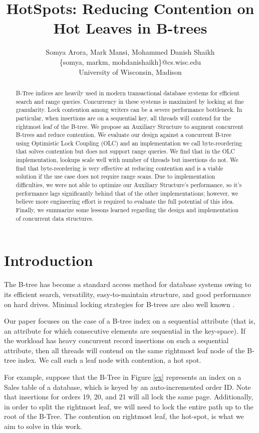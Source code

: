 \documentclass[twocolumn]{article}
\title{HotSpots: Reducing Contention on Hot Leaves in B-trees}
\date{}
\author{Somya Arora, Mark Mansi, Mohammed Danish Shaikh\\
\small{\{somya, markm, mohdanishaikh\}@cs.wisc.edu} \\
University of Wisconsin, Madison}
\begin{document}
\maketitle

\begin{abstract}
B-Tree indices are heavily used in modern transactional database systems for
efficient search and range queries. Concurrency in these systems is maximized
by locking at fine granularity. Lock contention among writers can be a severe
performance bottleneck. In particular, when insertions are on a sequential key,
all threads will contend for the rightmost leaf of the B-tree. We propose an
Auxiliary Structure to augment concurrent B-trees and reduce contention. We
evaluate our design against a concurrent B-tree using Optimistic Lock Coupling
(OLC) \cite{art} and an implementation we call byte-reordering that solves contention
but does not support range queries. We find that in the OLC implementation,
lookups scale well with number of threads but insertions do not. We find that
byte-reordering is very effective at reducing contention and is a viable
solution if the use case does not require range scans. Due to implementation
difficulties, we were not able to optimize our Auxiliary Structure’s
performance, so it’s performance lags significantly behind that of the other
implementations; however, we believe more engineering effort is required to
evaluate the full potential of this idea. Finally, we summarize some lessons
learned regarding the design and implementation of concurrent data structures.
\end{abstract}

\section{Introduction}
The B-tree has become a standard access method for database systems owing to
its efficient search, versatility, easy-to-maintain structure, and good
performance on hard drives. Minimal locking strategies for B-trees are also
well known \cite{blink}.

Our paper focuses on the case of a B-tree index on a sequential attribute (that
is, an attribute for which consecutive elements are sequential in the
key-space). If the workload has heavy concurrent record insertions on such a
sequential attribute, then all threads will contend on the same rightmost leaf
node of the B-tree index.  We call such a leaf node with contention, a hot
spot.

For example, suppose that the B-Tree in Figure \ref{ex} represents an index on a Sales
table of a database, which is keyed by an auto-incremented order ID. Note that
insertions for orders 19, 20, and 21 will all lock the same page. Additionally,
in order to split the rightmost leaf, we will need to lock the entire path up
to the root of the B-Tree. The contention on rightmost leaf, the hot-spot, is
what we aim to solve in this work.
\end{document}
